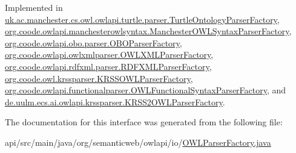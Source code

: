 Implemented in \hyperlink{classuk_1_1ac_1_1manchester_1_1cs_1_1owl_1_1owlapi_1_1turtle_1_1parser_1_1_turtle_ontology_parser_factory_a08bebf5911b8495e55b6c1b4ecedf853}{uk.\-ac.\-manchester.\-cs.\-owl.\-owlapi.\-turtle.\-parser.\-Turtle\-Ontology\-Parser\-Factory}, \hyperlink{classorg_1_1coode_1_1owlapi_1_1manchesterowlsyntax_1_1_manchester_o_w_l_syntax_parser_factory_a89d2b8a59b1770e6fa461f85305c7da5}{org.\-coode.\-owlapi.\-manchesterowlsyntax.\-Manchester\-O\-W\-L\-Syntax\-Parser\-Factory}, \hyperlink{classorg_1_1coode_1_1owlapi_1_1obo_1_1parser_1_1_o_b_o_parser_factory_a2efb8358a0dc3e8d8bb8a5eae59f4d88}{org.\-coode.\-owlapi.\-obo.\-parser.\-O\-B\-O\-Parser\-Factory}, \hyperlink{classorg_1_1coode_1_1owlapi_1_1owlxmlparser_1_1_o_w_l_x_m_l_parser_factory_ae6159b82c73f79d088eed4b0151accfb}{org.\-coode.\-owlapi.\-owlxmlparser.\-O\-W\-L\-X\-M\-L\-Parser\-Factory}, \hyperlink{classorg_1_1coode_1_1owlapi_1_1rdfxml_1_1parser_1_1_r_d_f_x_m_l_parser_factory_a4a2670c1fd482e8319a228fd8a428650}{org.\-coode.\-owlapi.\-rdfxml.\-parser.\-R\-D\-F\-X\-M\-L\-Parser\-Factory}, \hyperlink{classorg_1_1coode_1_1owl_1_1krssparser_1_1_k_r_s_s_o_w_l_parser_factory_af5d3b3d95f97034d8264eb87f276a3fd}{org.\-coode.\-owl.\-krssparser.\-K\-R\-S\-S\-O\-W\-L\-Parser\-Factory}, \hyperlink{classorg_1_1coode_1_1owlapi_1_1functionalparser_1_1_o_w_l_functional_syntax_parser_factory_aee9116cd7a16a9b127da6483894bdfa2}{org.\-coode.\-owlapi.\-functionalparser.\-O\-W\-L\-Functional\-Syntax\-Parser\-Factory}, and \hyperlink{classde_1_1uulm_1_1ecs_1_1ai_1_1owlapi_1_1krssparser_1_1_k_r_s_s2_o_w_l_parser_factory_a7be140fa4858d0ecca1dd57523e0e201}{de.\-uulm.\-ecs.\-ai.\-owlapi.\-krssparser.\-K\-R\-S\-S2\-O\-W\-L\-Parser\-Factory}.



The documentation for this interface was generated from the following file\-:\begin{DoxyCompactItemize}
\item 
api/src/main/java/org/semanticweb/owlapi/io/\hyperlink{_o_w_l_parser_factory_8java}{O\-W\-L\-Parser\-Factory.\-java}\end{DoxyCompactItemize}
